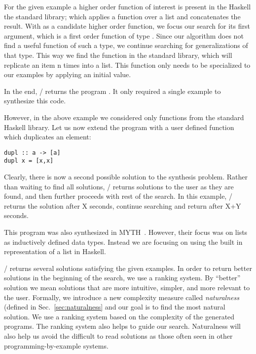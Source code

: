 For the given example a higher order function of interest is present in the Haskell the standard library;  which applies a function over a list and concatenates the result.
With  as a candidate higher order function, we focus
 our search for its first argument, which is a first order function of type .
Since our algorithm does not find a useful function of such a type, we continue searching for generalizations of that type.
This way we find the function  in the standard library, which will replicate an item n times into a list.
This function only needs to be specialized to our examples by applying an initial value.

In the end, \ourTool/ returns the program . It only required a single example to synthesize this code.

However, in the above example we considered only functions from the standard Haskell library. Let us now extend the program with a user defined function  which duplicates an element:
\begin{lstlisting}
dupl :: a -> [a]
dupl x = [x,x]
\end{lstlisting}

Clearly, there is now a second possible solution to the synthesis problem.
Rather than waiting to find all solutions, \ourTool/ returns solutions to the user as they are found, and then further proceeds with rest of the search.
In this example, \ourTool/ returns the solution  after X seconds, continue searching and return  after X+Y seconds.

This program was also synthesized in MYTH~\cite{Osera:2015}. However, their focus was on lists as inductively defined data types. Instead we 
are focusing on using the built in representation of a list in Haskell.

\ourTool/ returns several solutions satisfying the given examples. In
 order to return better solutions in the beginning of the search, we use a ranking system. By ``better'' solution we mean solutions that are more intuitive, simpler, and more relevant to the user. Formally, we introduce a new complexity measure called \textit{naturalness} (defined in 
Sec.~\ref{sec:naturalness} and our goal is to find the most natural solution. We use a ranking system based on the complexity of the 
generated programs. The ranking system also helps to guide our search.
Naturalness will also help us avoid the difficult to read solutions as those often seen in other programming-by-example systems.

